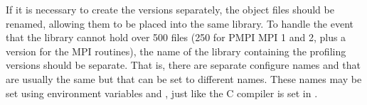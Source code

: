 \documentclass{article}
\begin{document}
%

If it is necessary to create the  versions separately, the
object files should be renamed, allowing them to be placed into the
same library.  To handle the event that the library cannot hold over
500 files (250 for PMPI MPI 1 and 2, plus a version for the MPI
routines), the name of the library containing the profiling versions
should be separate.  That is, there are separate configure names
 and  that are usually the same but that
can be set to different names.  These names may be set using environment
variables  and , just like the C compiler
is set in .

\end{document}
